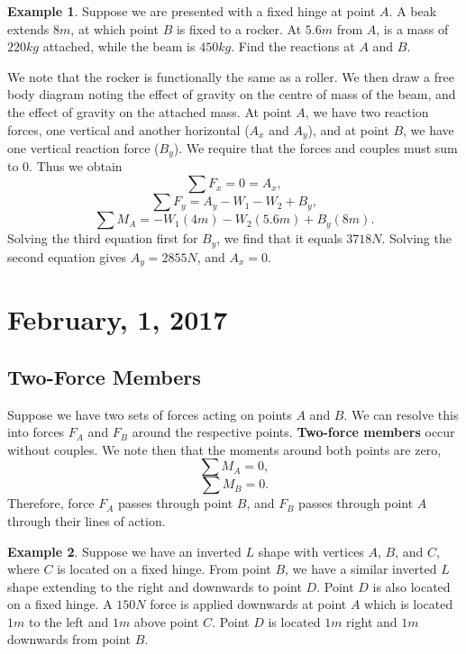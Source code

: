 \documentclass[11pt]{article}
\theoremstyle{plain} %
\theoremstyle{definition}
\theoremstyle{example}
\newtheorem*{example}{Example}
\theoremstyle{remark}
\begin{document}
\begin{example} 
Suppose we are presented with a fixed hinge at point $A$. A beak extends $8m$, at which point $B$ is fixed to a rocker. At $5.6m$ from $A$, is a mass of $220kg$ attached, while the beam is $450kg$. Find the reactions at $A$ and $B$. 
\end{example}

We note that the rocker is functionally the same as a roller. We then draw a free body diagram noting the effect of gravity on the centre of mass of the beam, and the effect of gravity on the attached mass. At point $A$, we have two reaction forces, one vertical and another horizontal ($A_x$ and $A_y$), and at point $B$, we have one vertical reaction force ($B_y$). We require that the forces and couples must sum to 0. Thus we obtain
$$\sum F_x = 0 = A_x,$$
$$\sum F_y = A_y - W_1 - W_2 +B_y,$$
$$\sum M_A = -W_1(4m) - W_2(5.6m)+B_y(8m).$$
Solving the third equation first for $B_y$, we find that it equals $3718N$. Solving the second equation gives $A_y = 2855N$, and $A_x = 0$. 











\section{February, 1, 2017}
\subsection{Two-Force Members}

Suppose we have two sets of forces acting on points $A$ and $B$. We can resolve this into forces $F_A$ and $F_B$ around the respective points. \textbf{Two-force members} occur without couples. 
We note then that the moments around both points are zero,
$$\sum M_A = 0,$$
$$\sum M_B = 0.$$
Therefore, force $F_A$ passes through point $B$, and $F_B$ passes through point $A$ through their lines of action. 


\begin{example}
Suppose we have an inverted $L$ shape with vertices $A$, $B$, and $C$, where $C$ is located on a fixed hinge. From point $B$, we have a similar inverted $L$ shape extending to the right and downwards to point $D$. Point $D$ is also located on a fixed hinge. A $150N$ force is applied downwards at point $A$ which is located $1m$ to the left and $1m$ above point $C$. Point $D$ is located $1m$ right and $1m$ downwards from point $B$.
\end{example}
\end{document}
